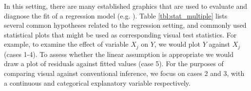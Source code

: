 \documentclass[12pt]{article}
\begin{document}
In this setting, there are many established graphics that are used to evaluate and diagnose the fit of a regression model (e.g. \citet{cook:99}). Table \ref{tbl:stat_multiple} lists several common hypotheses related to the regression setting, and commonly used statistical plots that might be used as corresponding visual test statistics.
For example, to examine the effect of variable $X_j$ on $Y$, we would plot $Y$ against $X_j$ (cases 1-4). To assess whether the linear assumption is appropriate we would draw a plot of residuals against fitted values (case 5). For the purposes of comparing visual against conventional inference, we focus on cases 2 and 3, with a continuous and categorical explanatory variable respectively. 

\end{document}
